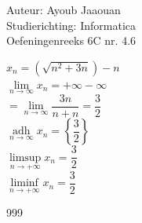 \documentclass[a4paper]{article}
\begin{document}
\noindent \large Auteur: Ayoub Jaaouan \\
\noindent \large Studierichting: Informatica\\
\noindent \large Oefeningenreeks 6C nr. 4.6\\
\medskip

\normalsize


$x_n = \left(\sqrt{n^2+3n}\right)-n$ \\

$\lim\limits_{n \to \infty} x_n = +\infty - \infty $\\

$ = \lim\limits_{n \to \infty} \dfrac{3n}{n+n} = \dfrac{3}{2}$\\

$\underset{n \to \infty}{\operatorname{adh}} x_n = \left\{\dfrac{3}{2}\right\}$ \\

$\limsup\limits_{n \to +\infty} x_n = \dfrac{3}{2} $\\

$\liminf\limits_{n \to +\infty} x_n = \dfrac{3}{2}$ \\

\begin{thebibliography}{999}
\end{thebibliography}
\end{document}
